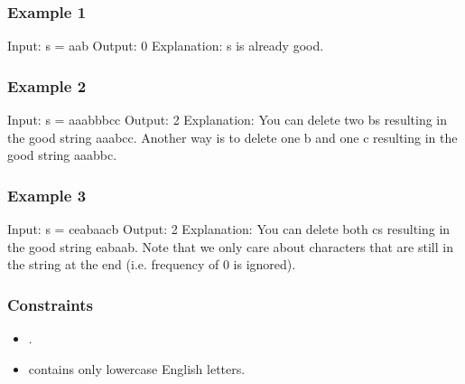 \documentclass[letterpaper,12pt,english]{book}
\begin{document}
\subsubsection{Example 1}
\label{\detokenize{Sorting/04_SORT_1647_Minimum_Deletions_to_Make_Character_Frequencies_Unique:example-1}}
\begin{sphinxVerbatim}[commandchars=\\\{\}]
Input: s = \PYGZdq{}aab\PYGZdq{}
Output: 0
Explanation: s is already good.
\end{sphinxVerbatim}


\subsubsection{Example 2}
\label{\detokenize{Sorting/04_SORT_1647_Minimum_Deletions_to_Make_Character_Frequencies_Unique:example-2}}
\begin{sphinxVerbatim}[commandchars=\\\{\}]
Input: s = \PYGZdq{}aaabbbcc\PYGZdq{}
Output: 2
Explanation: You can delete two \PYGZsq{}b\PYGZsq{}s resulting in the good string \PYGZdq{}aaabcc\PYGZdq{}.
Another way is to delete one \PYGZsq{}b\PYGZsq{} and one \PYGZsq{}c\PYGZsq{} resulting in the good string \PYGZdq{}aaabbc\PYGZdq{}.
\end{sphinxVerbatim}


\subsubsection{Example 3}
\label{\detokenize{Sorting/04_SORT_1647_Minimum_Deletions_to_Make_Character_Frequencies_Unique:example-3}}
\begin{sphinxVerbatim}[commandchars=\\\{\}]
Input: s = \PYGZdq{}ceabaacb\PYGZdq{}
Output: 2
Explanation: You can delete both \PYGZsq{}c\PYGZsq{}s resulting in the good string \PYGZdq{}eabaab\PYGZdq{}.
Note that we only care about characters that are still in the string at the end (i.e. frequency of 0 is ignored).
\end{sphinxVerbatim}


\subsubsection{Constraints}
\label{\detokenize{Sorting/04_SORT_1647_Minimum_Deletions_to_Make_Character_Frequencies_Unique:constraints}}\begin{itemize}
\item {} 
\sphinxAtStartPar
{}.

\item {} 
\sphinxAtStartPar
{} contains only lowercase English letters.

\end{itemize}
\end{document}
